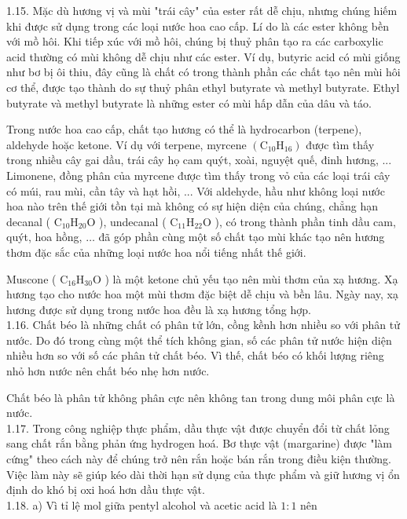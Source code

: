 \documentclass[10pt]{article}
\begin{document}
1.15. Mặc dù hương vị và mùi "trái cây" của ester rất dễ chịu, nhưng chúng hiếm khi được sử dụng trong các loại nước hoa cao cấp. Lí do là các ester không bền với mồ hôi. Khi tiếp xúc với mồ hôi, chúng bị thuỷ phân tạo ra các carboxylic acid thường có mùi không dễ chịu như các ester. Ví dụ, butyric acid có mùi giống như bơ bị ôi thiu, đây cũng là chất có trong thành phần các chất tạo nên mùi hôi cơ thể, được tạo thành do sự thuỷ phân ethyl butyrate và methyl butyrate. Ethyl butyrate và methyl butyrate là những ester có mùi hấp dẫn của dâu và táo.

Trong nước hoa cao cấp, chất tạo hương có thể là hydrocarbon (terpene), aldehyde hoặc ketone. Ví dụ với terpene, myrcene $\left(\mathrm{C}_{10} \mathrm{H}_{16}\right)$ được tìm thấy trong nhiều cây gai dầu, trái cây họ cam quýt, xoài, nguyệt quế, đinh hương, ... Limonene, đồng phân của myrcene được tìm thấy trong vỏ của các loại trái cây có múi, rau mùi, cần tây và hạt hồi, ... Với aldehyde, hầu như không loại nước hoa nào trên thế giới tồn tại mà không có sự hiện diện của chúng, chẳng hạn decanal ( $\mathrm{C}_{10} \mathrm{H}_{20} \mathrm{O}$ ), undecanal ( $\mathrm{C}_{11} \mathrm{H}_{22} \mathrm{O}$ ), có trong thành phần tinh dầu cam, quýt, hoa hồng, $\ldots$ đã góp phần cùng một số chất tạo mùi khác tạo nên hương thơm đặc sắc của những loại nước hoa nổi tiếng nhất thế giới.

Muscone ( $\mathrm{C}_{16} \mathrm{H}_{30} \mathrm{O}$ ) là một ketone chủ yếu tạo nên mùi thơm của xạ hương. Xạ hương tạo cho nước hoa một mùi thơm đặc biệt dễ chịu và bền lâu. Ngày nay, xạ hương được sử dụng trong nước hoa đều là xạ hương tổng hợp.\\
1.16. Chất béo là những chất có phân tử lớn, cồng kềnh hơn nhiều so với phân tử nước. Do đó trong cùng một thể tích không gian, số các phân tử nước hiện diện nhiều hơn so với số các phân tử chất béo. Vì thế, chất béo có khối lượng riêng nhỏ hơn nước nên chất béo nhẹ hơn nước.

Chất béo là phân tử không phân cực nên không tan trong dung môi phân cực là nước.\\
1.17. Trong công nghiệp thực phẩm, dầu thực vật được chuyển đổi từ chất lỏng sang chất rắn bằng phản ứng hydrogen hoá. Bơ thực vật (margarine) được "làm cứng" theo cách này để chúng trở nên rắn hoặc bán rắn trong điều kiện thường. Việc làm này sẽ giúp kéo dài thời hạn sử dụng của thực phẩm và giữ hương vị ổn định do khó bị oxi hoá hơn dầu thực vật.\\
1.18. a) Vì tỉ lệ mol giữa pentyl alcohol và acetic acid là $1: 1$ nên
\end{document}
